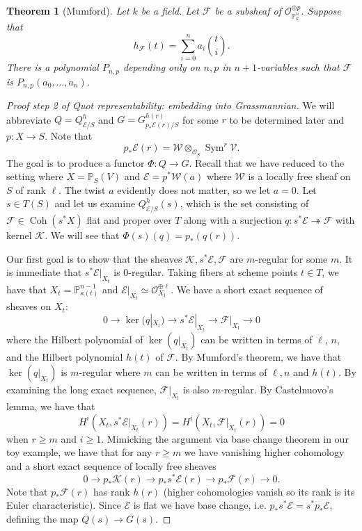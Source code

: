 \documentclass[10pt]{article}
\newtheorem{thm}{Theorem}[section]
\theoremstyle{definition}
\DeclareMathOperator{\Coh}{Coh}
\DeclareMathOperator{\Sym}{Sym}
\newcommand{\PP}{\mathbb{P}}
\newcommand{\OO}{\mathcal{O}}
\begin{document}
\begin{thm}[Mumford]
Let $k$ be a field.  Let $\mathcal{F}$ be a subsheaf of $\OO_{\PP^n_k}^{\oplus p}$.  Suppose that
$$h_{\mathcal{F}}(t) = \sum_{i=0}^n a_i \binom{t}{i}.$$
There is a polynomial $P_{n,p}$ depending only on $n, p$ in $n+1$-variables such that $\mathcal{F}$ is $P_{n,p}(a_0, \ldots, a_n)$.
\end{thm}

\begin{proof}[Proof step 2 of Quot representability: embedding into Grassmannian]
We will abbreviate $Q = Q^h_{\mathcal{E}/S}$ and $G = G^{h(r)}_{p_* \mathcal{E}(r)/S}$ for some $r$ to be determined later and $p: X \rightarrow S$.  Note that
$$p_*\mathcal{E}(r) = \mathcal{W} \otimes_{\OO_S} \Sym^r \mathcal{V}.$$ 
The goal is to produce a functor $\Phi: Q \rightarrow G$.  Recall that we have reduced to the setting where $X= \PP_S(V)$ and $\mathcal{E} = p^* \mathcal{W}(a)$ where $\mathcal{W}$ is a locally free sheaf on $S$ of rank $\ell$.  The twist $a$ evidently does not matter, so we let $a=0$.  Let $s \in T(S)$ and let us examine $Q^h_{\mathcal{E}/S}(s)$, which is the set consisting of $\mathcal{F} \in \Coh(s^* X)$ flat and proper over $T$ along with a surjection $q: s^* \mathcal{E} \twoheadrightarrow \mathcal{F}$ with kernel $\mathcal{K}$.  We will see that $\Phi(s)(q) = p_*(q(r))$.

Our first goal is to show that the sheaves $\mathcal{K}, s^*\mathcal{E}, \mathcal{F}$ are $m$-regular for some $m$.  It is immediate that $s^*\mathcal{E}|_{X_t}$ is 0-regular.  Taking fibers at scheme points $t \in T$, we have that $X_t = \PP^{n-1}_{\kappa(t)}$ and $\mathcal{E}|_{X_t} \simeq \OO_{X_t}^{\oplus \ell}$.  We have a short exact sequence of sheaves on $X_t$:
$$0 \rightarrow \ker(q|_{X_t}) \rightarrow s^*\mathcal{E}|_{X_t} \rightarrow \mathcal{F}|_{X_t} \rightarrow 0$$
where the Hilbert polynomial of $\ker(q|_{X_t})$ can be written in terms of $\ell$, $n$, and the Hilbert polynomial $h(t)$ of $\mathcal{F}$.  By Mumford's theorem, we have that $\ker(q|_{X_t})$ is $m$-regular where $m$ can be written in terms of $\ell, n$ and $h(t)$. By examining the long exact sequence, $\mathcal{F}|_{X_t}$ is also $m$-regular.  By Castelnuovo's lemma, we have that
$$H^i(X_t, s^*\mathcal{E}|_{X_t}(r)) = H^i(X_t, \mathcal{F}|_{X_t}(r)) = 0$$
when $r \geq m$ and $i \geq 1$.  Mimicking the argument via base change theorem in our toy example, we have that for any $r \geq m$ we have vanishing higher cohomology and a short exact sequence of locally free sheaves
$$0 \rightarrow p_* \mathcal{K}(r) \rightarrow p_* s^*\mathcal{E}(r) \rightarrow p_* \mathcal{F}(r) \rightarrow 0.$$
Note that $p_* \mathcal{F}(r)$ has rank $h(r)$ (higher cohomologies vanish so its rank is its Euler characteristic).  Since $\mathcal{E}$ is flat we have base change, i.e. $p_*s^* \mathcal{E} = s^*p_* \mathcal{E}$, defining the map $Q(s) \rightarrow G(s)$.


\end{proof}
\end{document}

